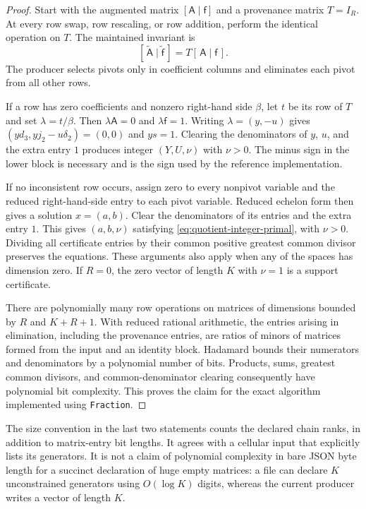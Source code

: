 \begin{proof}
Start with the augmented matrix $[\mathsf A\mid\mathsf f]$ and a
provenance matrix $T=I_R$. At every row swap, row rescaling, or row
addition, perform the identical operation on $T$. The maintained
invariant is
\[
 [\,\widetilde{\mathsf A}\mid\widetilde{\mathsf f}\,]
       =T[\,\mathsf A\mid\mathsf f\,].
\]
The producer selects pivots only in coefficient columns and eliminates
each pivot from all other rows.

If a row has zero coefficients and nonzero right-hand side $\beta$,
let $t$ be its row of $T$ and set $\lambda=t/\beta$.
Then $\lambda\mathsf A=0$ and $\lambda\mathsf f=1$.
Writing $\lambda=(y,-u)$ gives
$(yd_3,yj_2-u\delta_2)=(0,0)$ and $ys=1$.
Clearing the denominators of $y$, $u$, and the extra entry $1$
produces integer $(Y,U,\nu)$ with $\nu>0$.
The minus sign in the lower block is necessary and is the sign
used by the reference implementation.

If no inconsistent row occurs, assign zero to every nonpivot
variable and the reduced right-hand-side entry to each pivot
variable. Reduced echelon form then gives a solution $x=(a,b)$.
Clear the denominators of its entries and the extra entry $1$.
This gives $(a,b,\nu)$ satisfying
\eqref{eq:quotient-integer-primal}, with $\nu>0$.
Dividing all certificate entries by their common positive greatest
common divisor preserves the equations. These arguments also apply
when any of the spaces has dimension zero. If $R=0$, the zero vector
of length $K$ with $\nu=1$ is a support certificate.

There are polynomially many row operations on matrices of dimensions
bounded by $R$ and $K+R+1$. With reduced rational arithmetic, the
entries arising in elimination, including the provenance entries,
are ratios of minors of matrices formed from the input and an
identity block. Hadamard bounds their numerators and denominators
by a polynomial number of bits. Products, sums, greatest common
divisors, and common-denominator clearing consequently have
polynomial bit complexity. This proves the claim for the exact
algorithm implemented using \texttt{Fraction}.
\end{proof}

The size convention in the last two statements counts the declared
chain ranks, in addition to matrix-entry bit lengths. It agrees with
a cellular input that explicitly lists its generators. It is not a
claim of polynomial complexity in bare JSON byte length for a
succinct declaration of huge empty matrices: a file can declare
$K$ unconstrained generators using $O(\log K)$ digits, whereas the
current producer writes a vector of length $K$.

